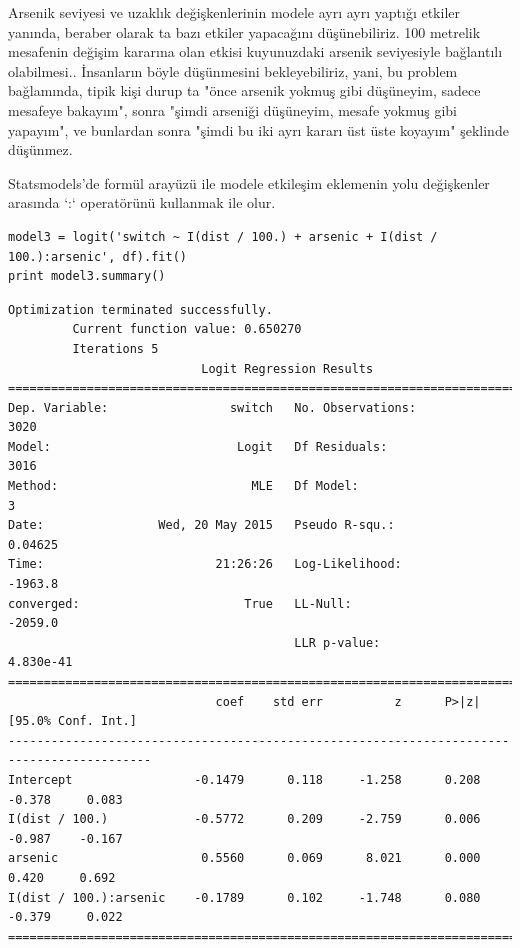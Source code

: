 \documentclass[12pt,fleqn]{article}\usepackage{../../common}
\begin{document}
Arsenik seviyesi ve uzaklık değişkenlerinin modele ayrı ayrı yaptığı etkiler
yanında, beraber olarak ta bazı etkiler yapacağını düşünebiliriz.  100 metrelik
mesafenin değişim kararına olan etkisi kuyunuzdaki arsenik seviyesiyle
bağlantılı olabilmesi.. İnsanların böyle düşünmesini bekleyebiliriz, yani, bu
problem bağlamında, tipik kişi durup ta "önce arsenik yokmuş gibi düşüneyim,
sadece mesafeye bakayım", sonra "şimdi arseniği düşüneyim, mesafe yokmuş gibi
yapayım", ve bunlardan sonra "şimdi bu iki ayrı kararı üst üste koyayım"
şeklinde düşünmez.

Statsmodels'de formül arayüzü ile modele etkileşim eklemenin yolu değişkenler
arasında `:` operatörünü kullanmak ile olur.

\begin{verbatim}
model3 = logit('switch ~ I(dist / 100.) + arsenic + I(dist / 100.):arsenic', df).fit()
print model3.summary()
\end{verbatim}

\begin{verbatim}
Optimization terminated successfully.
         Current function value: 0.650270
         Iterations 5
                           Logit Regression Results                           
==============================================================================
Dep. Variable:                 switch   No. Observations:                 3020
Model:                          Logit   Df Residuals:                     3016
Method:                           MLE   Df Model:                            3
Date:                Wed, 20 May 2015   Pseudo R-squ.:                 0.04625
Time:                        21:26:26   Log-Likelihood:                -1963.8
converged:                       True   LL-Null:                       -2059.0
                                        LLR p-value:                 4.830e-41
==========================================================================================
                             coef    std err          z      P>|z|      [95.0% Conf. Int.]
------------------------------------------------------------------------------------------
Intercept                 -0.1479      0.118     -1.258      0.208        -0.378     0.083
I(dist / 100.)            -0.5772      0.209     -2.759      0.006        -0.987    -0.167
arsenic                    0.5560      0.069      8.021      0.000         0.420     0.692
I(dist / 100.):arsenic    -0.1789      0.102     -1.748      0.080        -0.379     0.022
==========================================================================================
\end{verbatim}
\end{document}
